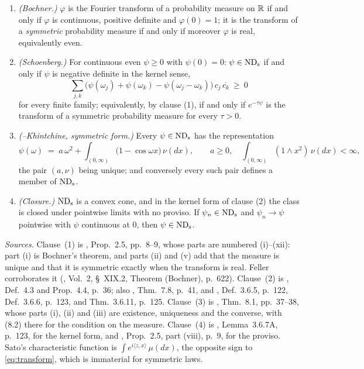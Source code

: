 \begin{proposition}\label{prop:fourier-toolbox}
\begin{enumerate}
\item \emph{(Bochner.)} $\varphi$ is the Fourier transform of a probability measure on $\mathbb{R}$
if and only if $\varphi$ is continuous, positive definite and $\varphi(0) = 1$; it is the
transform of a \emph{symmetric} probability measure if and only if moreover $\varphi$ is real,
equivalently even.
\item \emph{(Schoenberg.)} For continuous even $\psi \ge 0$ with $\psi(0) = 0$: $\psi \in \mathrm{ND}_{\mathrm{s}}$
if and only if $\psi$ is negative definite in the kernel sense,
\[
  \sum_{j,k}\bigl(\psi(\omega_j) + \psi(\omega_k) - \psi(\omega_j - \omega_k)\bigr)\,
  c_j\,\overline{c_k} \ \ge\ 0
\]
for every finite family; equivalently, by clause (1), if and only if $e^{-\tau\psi}$ is the
transform of a symmetric probability measure for every $\tau > 0$.
\item \emph{(\Levy--Khintchine, symmetric form.)} Every $\psi \in \mathrm{ND}_{\mathrm{s}}$ has the representation
\begin{equation}\label{eq:levy-khintchine}
  \psi(\omega) \;=\; a\,\omega^2 + \int_{(0,\infty)} \bigl(1 - \cos\omega x\bigr)\,\nu(dx),
  \qquad a \ge 0, \quad \int_{(0,\infty)} (1 \wedge x^2)\,\nu(dx) < \infty,
\end{equation}
the pair $(a,\nu)$ being unique; and conversely every such pair defines a member of $\mathrm{ND}_{\mathrm{s}}$.
\item \emph{(Closure.)} $\mathrm{ND}_{\mathrm{s}}$ is a convex cone, and in the kernel form of clause (2) the
class is closed under pointwise limits with no proviso. If $\psi_n \in \mathrm{ND}_{\mathrm{s}}$ and
$\psi_n \to \psi$ pointwise with $\psi$ continuous at $0$, then $\psi \in \mathrm{ND}_{\mathrm{s}}$.
\end{enumerate}
\end{proposition}

\emph{Sources.} Clause~(1) is , Prop.~2.5, pp.~8--9, whose parts are
numbered (i)--(xii): part (i) is Bochner's theorem, and parts (ii) and (v) add that the
measure is unique and that it is symmetric exactly when the transform is real. Feller
corroborates it (, Vol.~2, \S~XIX.2, Theorem (Bochner),
p.~622). Clause~(2) is , Def.~4.3 and Prop.~4.4, p.~36; also
, Thm.~7.8, p.~41, and , Def.~3.6.5,
p.~122, Def.~3.6.6, p.~123, and Thm.~3.6.11, p.~125. Clause~(3) is ,
Thm.~8.1, pp.~37--38, whose parts (i), (ii) and (iii) are existence, uniqueness and the
converse, with (8.2) there for the condition on the \Levy{} measure. Clause~(4) is
, Lemma~3.6.7A, p.~123, for the kernel form, and
, Prop.~2.5, part (viii), p.~9, for the proviso. Sato's characteristic
function is $\int e^{i\langle z, x\rangle}\,\mu(dx)$, the opposite sign to
\ref{eq:transform}, which is immaterial for symmetric laws.

